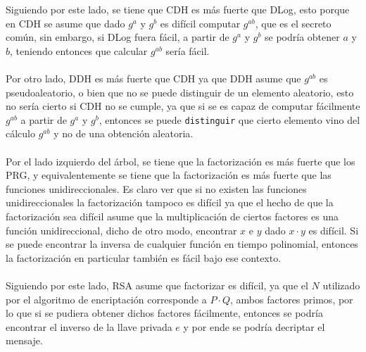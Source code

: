 \documentclass[twoside]{tareas}
\begin{document}
Siguiendo por este lado, se tiene que CDH es más fuerte que DLog, esto porque en CDH se asume que dado $g^{a}$ y $g^{b}$ es difícil computar $g^{ab}$, que es el secreto común, sin embargo, si DLog fuera fácil, a partir de $g^{a}$ y $g^{b}$ se podría obtener $a$ y $b$, teniendo entonces que calcular $g^{ab}$ sería fácil.
\\\\
Por otro lado, DDH es más fuerte que CDH ya que DDH asume que $g^{ab}$ es pseudoaleatorio, o bien que no se puede distinguir de un elemento aleatorio, esto no sería cierto si CDH no se cumple, ya que si se es capaz de computar fácilmente $g^{ab}$ a partir de $g^{a}$ y $g^{b}$, entonces se puede \texttt{distinguir} que cierto elemento vino del cálculo $g^{ab}$ y no de una obtención aleatoria.
\\\\
Por el lado izquierdo del árbol, se tiene que la factorización es más fuerte que los PRG, y equivalentemente se tiene que la factorización es más fuerte que las funciones unidireccionales. Es claro ver que si no existen las funciones unidireccionales la factorización tampoco es difícil ya que el hecho de que la factorización sea difícil asume que la multiplicación de ciertos factores es una función unidireccional, dicho de otro modo, encontrar $x$ e $y$ dado $x\cdot y$ es difícil. Si se puede encontrar la inversa de cualquier función en tiempo polinomial, entonces la factorización en particular también es fácil bajo ese contexto.
\\\\
Siguiendo por este lado, RSA asume que factorizar es difícil, ya que el $N$ utilizado por el algoritmo de encriptación corresponde a $P\cdot Q$, ambos factores primos, por lo que si se pudiera obtener dichos factores fácilmente, entonces se podría encontrar el inverso de la llave privada $e$ y por ende se podría decriptar el mensaje.
\end{document}
